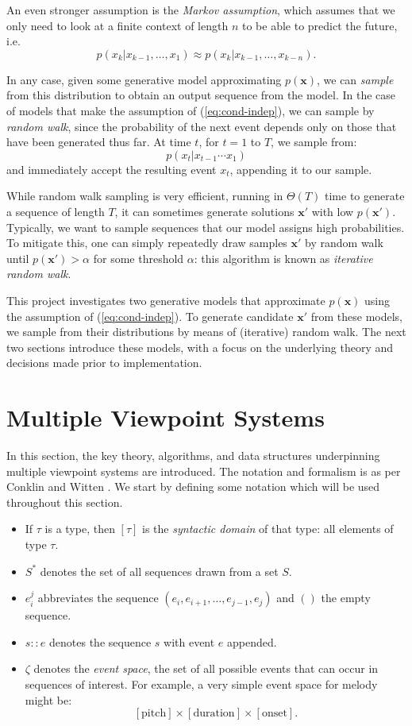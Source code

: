 \documentclass[12pt,a4paper,twoside,openright]{report}
\newcommand{\vect}[1]{\boldsymbol{\mathbf{#1}}}
\begin{document}
An even stronger assumption is the \emph{Markov assumption}, which assumes that
we only need to look at a finite context of length $n$ to be able to predict the
future, i.e.
$$ p(x_k | x_{k-1}, \ldots, x_1) \approx p(x_k | x_{k-1}, \ldots, x_{k-n}). $$

In any case, given some generative model approximating $p(\vect{x})$, we can
\emph{sample} from this distribution to obtain an output sequence from the
model. In the case of models that make the assumption of (\ref{eq:cond-indep}),
we can sample by \emph{random walk}, since the probability of the next event
depends only on those that have been generated thus far. At time $t$, for $t =
1$ to $T$, we sample from:
$$ p(x_t | x_{t-1} \cdots x_1) $$
and immediately accept the resulting event $x_t$, appending it to our sample.

While random walk sampling is very efficient, running in $\Theta(T)$ time to
generate a sequence of length $T$, it can sometimes generate solutions
$\vect{x}'$ with low $p(\vect{x}')$. Typically, we want to sample sequences that
our model assigns high probabilities. To mitigate this, one can simply
repeatedly draw samples $\vect{x}'$ by random walk until $p(\vect{x}') > \alpha$
for some threshold $\alpha$: this algorithm is known as \emph{iterative random
walk}.

This project investigates two generative models that approximate $p(\vect{x})$
using the assumption of (\ref{eq:cond-indep}). To generate candidate $\vect{x}'$
from these models, we sample from their distributions by means of (iterative)
random walk. The next two sections introduce these models, with a focus on the
underlying theory and decisions made prior to implementation.

\section{Multiple Viewpoint Systems}

In this section, the key theory, algorithms, and data structures underpinning
multiple viewpoint systems are introduced. The notation and formalism is as per
Conklin and Witten \cite{conklin1995viewpoints}. We start by defining some
notation which will be used throughout this section.

\begin{itemize}[itemsep=0mm]
  \item If $\tau$ is a type, then $[\tau]$ is the \emph{syntactic domain} of
    that type: all elements of type $\tau$.   
  \item $S^*$ denotes the set of all sequences drawn from a set $S$.
  \item $e_i^j$ abbreviates the sequence $(e_i,e_{i+1},\ldots,e_{j-1},e_j)$ and
    $()$ the empty sequence.
  \item $s :: e$ denotes the sequence $s$ with event $e$ appended.
  \item $\zeta$ denotes the \emph{event space}, the set of all possible events
    that can occur in sequences of interest. For example, a very simple event
    space for melody might be:
    $$ [\mathrm{pitch}] \times [\mathrm{duration}] \times [\mathrm{onset}]. $$
\end{itemize}
\end{document}
